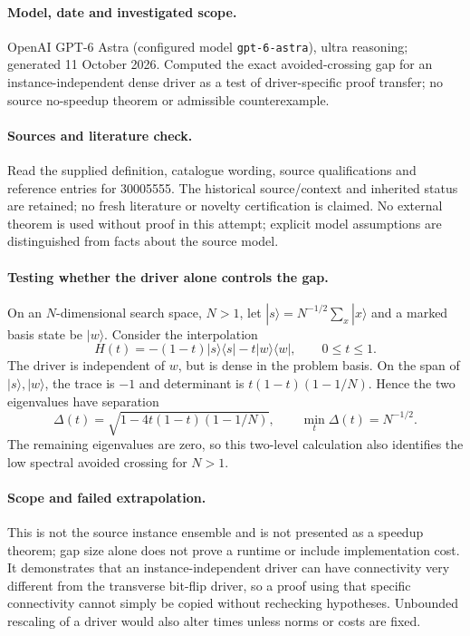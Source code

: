 \documentclass[11pt]{article}
\begin{document}
\paragraph{Model, date and investigated scope.}
OpenAI GPT-6 Astra (configured model \texttt{gpt-6-astra}), ultra reasoning; generated 11 October 2026. Computed the exact avoided-crossing gap for an instance-independent dense driver as a test of driver-specific proof transfer; no source no-speedup theorem or admissible counterexample.

\paragraph{Sources and literature check.}
Read the supplied definition, catalogue wording, source qualifications and reference entries for 30005555. The historical source/context and inherited status are retained; no fresh literature or novelty certification is claimed. No external theorem is used without proof in this attempt; explicit model assumptions are distinguished from facts about the source model.

\paragraph{Testing whether the driver alone controls the gap.} On an \(N\)-dimensional search space, \(N>1\), let \(|s\rangle=N^{-1/2}\sum_x|x\rangle\) and a marked basis state be \(|w\rangle\). Consider the interpolation
\[
 H(t)=-(1-t)|s\rangle\langle s|-t|w\rangle\langle w|,\qquad0\le t\le1.
\]
The driver is independent of \(w\), but is dense in the problem basis. On the span of \(|s\rangle,|w\rangle\), the trace is \(-1\) and determinant is \(t(1-t)(1-1/N)\). Hence the two eigenvalues have separation
\[
 \Delta(t)=\sqrt{1-4t(1-t)(1-1/N)},\qquad \min_t\Delta(t)=N^{-1/2}.
\]
The remaining eigenvalues are zero, so this two-level calculation also identifies the low spectral avoided crossing for \(N>1\).
\paragraph{Scope and failed extrapolation.} This is not the source instance ensemble and is not presented as a speedup theorem; gap size alone does not prove a runtime or include implementation cost. It demonstrates that an instance-independent driver can have connectivity very different from the transverse bit-flip driver, so a proof using that specific connectivity cannot simply be copied without rechecking hypotheses. Unbounded rescaling of a driver would also alter times unless norms or costs are fixed.
\end{document}
